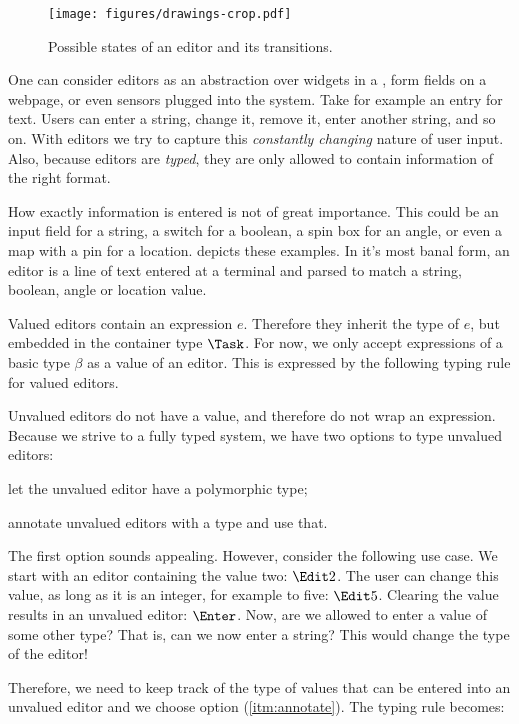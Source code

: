 \begin{figure}[h]
  \centering
  \texttt{[image: figures/drawings-crop.pdf]}
  \caption{Possible states of an editor and its transitions.}
  \label{fig:editor-state}
\end{figure}

One can consider editors as an abstraction over widgets in a \GUI,
form fields on a webpage,
or even sensors plugged into the system.
Take for example an entry for text.
Users can enter a string, change it, remove it, enter another string, and so on.
With editors we try to capture this \emph{constantly changing} nature of user input.
Also, because editors are \emph{typed},
they are only allowed to contain information of the right format.

How exactly information is entered is not of great importance.
This could be an input field for a string,
a switch for a boolean,
a spin box for an angle,
or even a map with a pin for a location.
 depicts these examples.
In it's most banal form,
an editor is a line of text entered at a terminal and parsed to match a string, boolean, angle or location value.

Valued editors contain an expression $e$.
Therefore they inherit the type of $e$,
but embedded in the container type $\Task$.
For now, we only accept expressions of a basic type $\beta$ as a value of an editor.
This is expressed by the following typing rule for valued editors.

Unvalued editors do not have a value,
and therefore do not wrap an expression.
Because we strive to a fully typed system,
we have two options to type unvalued editors:
\begin{enumerate*}
  \item let the unvalued editor have a polymorphic type;
  \item annotate unvalued editors with a type and use that. \label{itm:annotate}
\end{enumerate*}

The first option sounds appealing.
However, consider the following use case.
We start with an editor containing the value two: $\Edit 2$.
The user can change this value, as long as it is an integer,
for example to five: $\Edit 5$.
Clearing the value results in an unvalued editor: $\Enter$.
Now, are we allowed to enter a value of some other type?
That is, can we now enter a string?
This would change the type of the editor!

Therefore,
we need to keep track of the type of values that can be entered into an unvalued editor
and we choose option (\ref{itm:annotate}).
The typing rule becomes:

